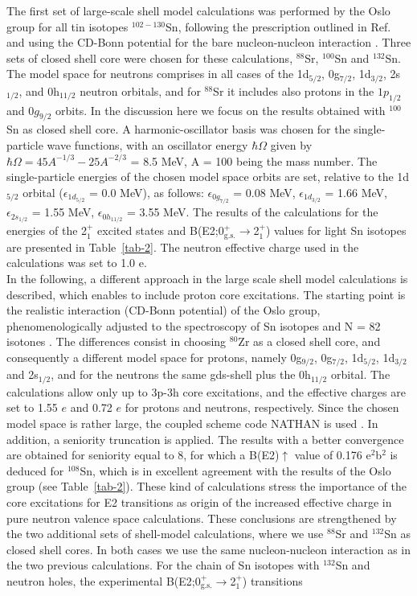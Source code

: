 \documentclass[aps,prc,twocolumn,amssymb,showpacs]{revtex4}
\begin{document}
The first set of large-scale shell model calculations was performed by the
Oslo group for all tin isotopes $^{102-130}$Sn, following the prescription outlined 
in Ref.~\cite{hjo95} and using the CD-Bonn potential for 
the bare nucleon-nucleon interaction
\cite{mac96}. Three sets of closed shell core were chosen for these calculations, 
$^{88}$Sr,
$^{100}$Sn and $^{132}$Sn. The model space for neutrons comprises in all cases
of the 1d$_{5/2}$, 0g$_{7/2}$, 1d$_{3/2}$,
2s$_{1/2}$, and 0h$_{11/2}$ neutron orbitals, and for $^{88}$Sr it includes also
protons in the $1p_{1/2}$ and $0g_{9/2}$ orbits. 
In the discussion here we focus on the results obtained with $^{100}$Sn as closed shell
core. 
A harmonic-oscillator basis was chosen for the single-particle wave
functions, with an oscillator energy $\hbar\Omega$ given by
$\hbar\Omega = 45A^{-1/3} -25A^{-2/3}$ = 8.5 MeV, A = 100 being
the mass number. The single-particle energies of the chosen model
space orbits are set, relative to the 1d$_{5/2}$ orbital
($\epsilon_{1d_{5/2}}$ = 0.0 MeV), as follows:
$\epsilon_{0g_{7/2}}$ = 0.08 MeV, $\epsilon_{1d_{3/2}}$ = 1.66
MeV, $\epsilon_{2s_{1/2}}$ = 1.55 MeV, $\epsilon_{0h_{11/2}}$ =
3.55 MeV. The results of the calculations for the energies of the
2$^+_1$ excited states and
B(E2;0$^+_{\text{g.s.}}$$\rightarrow$2$^+_1$) values for light Sn isotopes are presented
in Table~\ref{tab-2}. The neutron effective charge used in the
calculations was set to  1.0 e.\\
In the following, a different approach in the large scale shell
model calculations is described, which enables to include proton
core excitations. The starting point is the realistic interaction
(CD-Bonn potential) of the Oslo group, phenomenologically adjusted
to the spectroscopy of Sn isotopes and N = 82 isotones
\cite{gni05}. The differences consist in choosing $^{80}$Zr as a
closed shell core, and consequently a different model space for
protons, namely 0g$_{9/2}$, 0g$_{7/2}$, 1d$_{5/2}$, 1d$_{3/2}$ and
2s$_{1/2}$, and for the neutrons the same gds-shell plus the
0h$_{11/2}$ orbital. The calculations allow only up to 3p-3h core
excitations, and the effective charges are set to 1.55 $e$ and
0.72 $e$ for protons and neutrons, respectively. Since the chosen
model space is rather large, the coupled scheme code NATHAN is
used \cite{cau02}. In addition, a seniority truncation is applied.
The results with a better convergence are obtained for seniority
equal to 8, for which a B(E2)$\uparrow$ value of 0.176 e$^2$b$^2$
is deduced for $^{108}$Sn, which is in excellent agreement with
the results of the Oslo group (see Table~\ref{tab-2}). These kind
of calculations stress the importance of the core excitations for
E2 transitions as origin of the increased effective charge in pure
neutron valence
space calculations.  These conclusions are strengthened by the two additional
sets of shell-model calculations, where we use 
$^{88}$Sr and $^{132}$Sn as closed shell cores. In both cases we use the same 
nucleon-nucleon interaction as in the two previous calculations.
For the chain of Sn isotopes with $^{132}$Sn and neutron holes, the experimental 
 B(E2;0$^+_{\text{g.s.}}$$\rightarrow$2$^+_1$) transitions 
\end{document}
